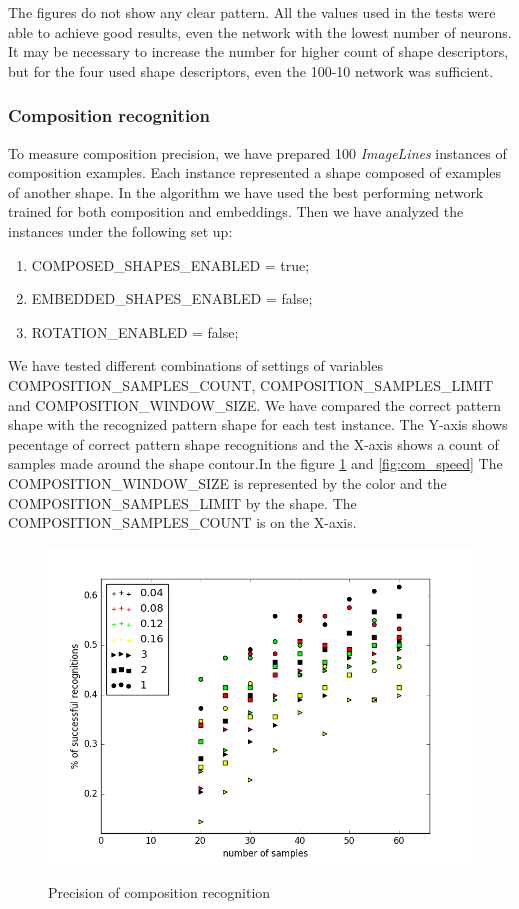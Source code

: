 The figures do not show any clear pattern. All the values used in the tests were able to achieve good results, even the network with the lowest number of neurons. It may be necessary to increase the number for higher count of shape descriptors, but for the four used shape descriptors, even the 100-10 network was sufficient.

\subsubsection{Composition recognition}
To measure composition precision, we have prepared 100 \emph{ImageLines} instances of composition examples. Each instance represented a shape composed of examples of another shape. In the algorithm we have used the best performing network trained for both composition and embeddings. Then we have analyzed the instances under the following set up:
\begin{enumerate}
\item COMPOSED\_SHAPES\_ENABLED = true;
\item EMBEDDED\_SHAPES\_ENABLED = false;
\item ROTATION\_ENABLED = false;
\end{enumerate}
We have tested different combinations of settings of variables COMPOSITION\_SAMPLES\_COUNT, COMPOSITION\_SAMPLES\_LIMIT and COMPOSITION\_WINDOW\_SIZE. We have compared the correct pattern shape with the recognized pattern shape for each test instance. The Y-axis shows pecentage of correct pattern shape recognitions and the X-axis shows a count of samples made around the shape contour.In the figure \ref{fig:com} and \ref{fig:com_speed} The COMPOSITION\_WINDOW\_SIZE is represented by the color and the COMPOSITION\_SAMPLES\_LIMIT by the shape. The COMPOSITION\_SAMPLES\_COUNT is on the X-axis. 
\begin{figure}[!htb]
\begin{center}
\label{fig:com}
\includegraphics[width=\linewidth]{ext/figure_composition.png}
\end{center}
	\centering
	\caption{Precision of composition recognition}
\end{figure}
